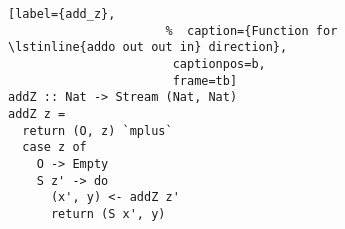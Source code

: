 \begin{figure}[!t]
  \centering
  \begin{minipage}{\columnwidth}
    \begin{lstlisting}[label={add_z},
                      %  caption={Function for \lstinline{addo out out in} direction},
                       captionpos=b,
                       frame=tb]
addZ :: Nat -> Stream (Nat, Nat)
addZ z =
  return (O, z) `mplus`
  case z of
    O -> Empty
    S z' -> do
      (x', y) <- addZ z'
      return (S x', y)
    \end{lstlisting}
  \end{minipage}
\end{figure}